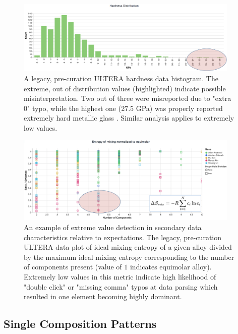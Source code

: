 \begin{figure}[H]
    \centering
    \includegraphics[width=0.95\textwidth]{pyqalloy/pyqalloy_extremevalues.png}
    \caption{A legacy, pre-curation ULTERA hardness data histogram. The extreme, out of distribution values (highlighted) indicate possible misinterpretation. Two out of three were misreported due to "extra 0" typo, while the highest one (27.5 GPa) was properly reported  extremely hard metallic glass \cite{Kim2016DevelopmentRatios}. Similar analysis applies to extremely low values.}
    \label{pyqalloy:fig:extreme}
\end{figure}


\begin{figure}[H]
    \centering
    \includegraphics[width=0.95\textwidth]{pyqalloy/pyqalloy_entropy.png}
    \caption{An example of extreme value detection in secondary data characteristics relative to expectations. The legacy, pre-curation ULTERA data plot of ideal mixing entropy of a given alloy divided by the maximum ideal mixing entropy corresponding to the number of components present (value of $1$ indicates equimolar alloy). Extremely low values in this metric indicate high likelihood of "double click" or "missing comma" typos at data parsing which resulted in one element becoming highly dominant.}
    \label{pyqalloy:fig:lowentropy}
\end{figure}


\subsection{Single Composition Patterns} \label{pyqalloy:ssec:singlecomp}

